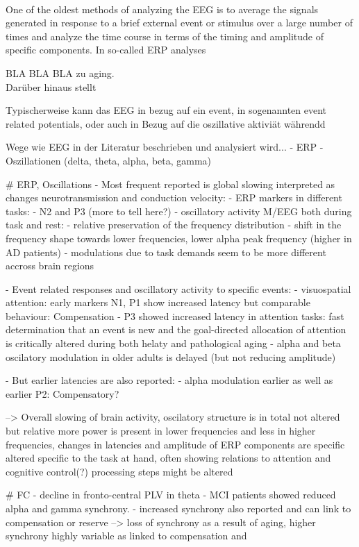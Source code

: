 \\
One of the oldest methods of analyzing the EEG is to average the signals generated in response to a brief external event or stimulus over a large number of times and analyze the time course in terms of the timing and amplitude of specific components. In so-called ERP analyses

BLA BLA BLA zu aging. 
\\ 
Darüber hinaus stellt 



Typischerweise kann das EEG in bezug auf ein event, in sogenannten event related potentials, oder auch in Bezug auf die oszillative aktiviät währendd   


Wege wie EEG in der Literatur beschrieben und analysiert wird... 
- ERP
- Oszillationen (delta, theta, alpha, beta, gamma)  

# ERP, Oscillations
- Most frequent reported is global slowing interpreted as changes neurotransmission and conduction velocity: 
    - ERP markers in different tasks: 
        - N2 and P3 (more to tell here?) 
    - oscillatory activity M/EEG both during task and rest: 
        - relative preservation of the frequency distribution 
        - shift in the frequency shape towards lower frequencies, lower alpha peak frequency (higher in AD patients)
        - modulations due to task demands seem to be more different accross brain regions

- Event related responses and oscillatory activity to specific events:
    - visuospatial attention: early markers N1, P1 show increased latency but comparable behaviour: Compensation
    - P3 showed increased latency in attention tasks: fast determination that an event is new and the goal-directed allocation of attention is critically altered during both helaty and pathological aging 
    - alpha and beta oscilatory modulation in older adults is delayed (but not reducing amplitude)

- But earlier latencies are also reported: 
    - alpha modulation earlier as well as earlier P2: Compensatory?

--> Overall slowing of brain activity, oscilatory structure is in total not altered but relative more power is present in lower frequencies and less in higher frequencies, changes in latencies and amplitude of ERP components are specific altered specific to the task at hand, often showing relations to attention and cognitive control(?) processing steps might be altered 

# FC 
- decline in fronto-central PLV in theta
- MCI patients showed reduced alpha and gamma synchrony.
- increased synchrony also reported and can link to compensation or reserve 
--> loss of synchrony as a result of aging, higher synchrony highly variable as linked to compensation and 

